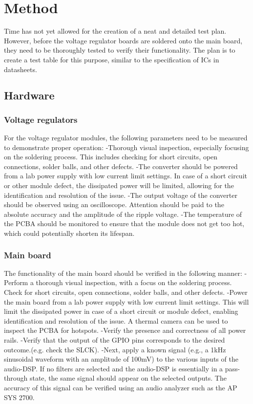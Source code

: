 \section{Method}
Time has not yet allowed for the creation of a neat and detailed test plan. However, before the voltage regulator boards are soldered onto the main board, they need to be thoroughly tested to verify their functionality. The plan is to create a test table for this purpose, similar to the specification of ICs in datasheets.

\subsection{Hardware}
\subsubsection{Voltage regulators}
For the voltage regulator modules, the following parameters need to be measured to demonstrate proper operation:
-Thorough visual inspection, especially focusing on the soldering process. This includes checking for short circuits, open connections, solder balls, and other defects.
-The converter should be powered from a lab power supply with low current limit settings. In case of a short circuit or other module defect, the dissipated power will be limited, allowing for the identification and resolution of the issue.
-The output voltage of the converter should be observed using an oscilloscope. Attention should be paid to the absolute accuracy and the amplitude of the ripple voltage.
-The temperature of the PCBA should be monitored to ensure that the module does not get too hot, which could potentially shorten its lifespan.

\subsubsection{Main board}
The functionality of the main board should be verified in the following manner:
-Perform a thorough visual inspection, with a focus on the soldering process. Check for short circuits, open connections, solder balls, and other defects.
-Power the main board from a lab power supply with low current limit settings. This will limit the dissipated power in case of a short circuit or module defect, enabling identification and resolution of the issue. A thermal camera can be used to inspect the PCBA for hotspots.
-Verify the presence and correctness of all power rails.
-Verify that the output of the GPIO pins corresponds to the desired outcome.(e.g. check the SLCK).
-Next, apply a known signal (e.g., a 1kHz sinusoidal waveform with an amplitude of 100mV) to the various inputs of the audio-DSP. If no filters are selected and the audio-DSP is essentially in a pass-through state, the same signal should appear on the selected outputs. The accuracy of this signal can be verified using an audio analyzer such as the AP SYS 2700.

